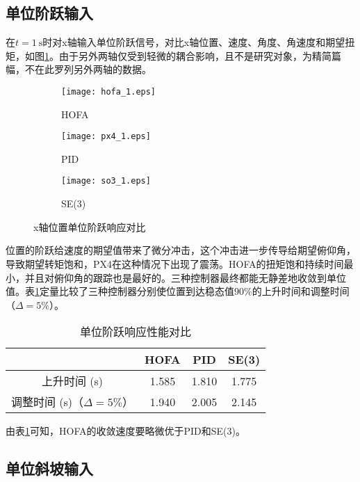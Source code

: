 \subsection*{单位阶跃输入}

  在$t=1 \ \text{s}$时对x轴输入单位阶跃信号，对比x轴位置、速度、角度、角速度和期望扭矩，如图\ref{MATLAB_阶跃}。由于另外两轴仅受到轻微的耦合影响，且不是研究对象，为精简篇幅，不在此罗列另外两轴的数据。
\newpage
\newpage
\begin{figure}[!htp]
  \centering
  \begin{subfigure}[t]{0.49\textwidth}
    \centering
    \texttt{[image: hofa\_1.eps]}
    \caption{HOFA}
  \end{subfigure}\hfill
  \begin{subfigure}[t]{0.49\textwidth}
    \centering
    \texttt{[image: px4\_1.eps]}
    \caption{PID}
  \end{subfigure}\hfill
  \begin{subfigure}[t]{0.49\textwidth}
    \centering
    \texttt{[image: so3\_1.eps]}
    \caption{SE(3)}
  \end{subfigure}
  \caption{x轴位置单位阶跃响应对比}
  \label{MATLAB_阶跃}
\end{figure}

位置的阶跃给速度的期望值带来了微分冲击，这个冲击进一步传导给期望俯仰角，导致期望转矩饱和，PX4在这种情况下出现了震荡。HOFA的扭矩饱和持续时间最小，并且对俯仰角的跟踪也是最好的。三种控制器最终都能无静差地收敛到单位值。表\ref{MATLAB阶跃对比}定量比较了三种控制器分别使位置到达稳态值$90\%$的上升时间和调整时间（$\Delta = 5\%$）。
\begin{table}[!h]
  \centering
  \caption{单位阶跃响应性能对比}
  \begin{tabular}{cccc}
      \toprule
      & HOFA & PID & SE(3) \\
      \midrule
    上升时间 (s) & 1.585 & 1.810 & 1.775\\
    调整时间 (s)（$\Delta = 5\%$） & 1.940 & 2.005 &2.145 \\
      \bottomrule
  \end{tabular}
  \label{MATLAB阶跃对比}
\end{table}
由表\ref{MATLAB阶跃对比}可知，HOFA的收敛速度要略微优于PID和SE(3)。

\subsection*{单位斜坡输入}

